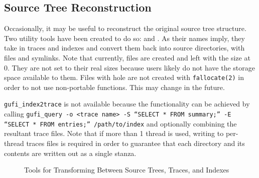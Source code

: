 \subsection{Source Tree Reconstruction}

Occasionally, it may be useful to reconstruct the original source tree
structure. Two utility tools have been created to do so: \gufitracedir
and \gufiindexdir. As their names imply, they take in traces and indexes
and convert them back into source directories, with files and
symlinks. Note that currently, files are created and left with the
size at 0. They are not set to their real sizes because users likely
do not have the storage space available to them. Files with hole are
not created with \texttt{fallocate(2)} in order to not use
non-portable functions. This may change in the future.

\texttt{gufi\_index2trace} is not available because the functionality
can be achieved by calling \texttt{gufi\_query -o <trace name> -S
  ``SELECT * FROM summary;'' -E ``SELECT * FROM entries;''
  /path/to/index} and optionally combining the resultant trace
files. Note that if more than 1 thread is used, writing to per-thread
traces files is required in order to guarantee that each
directory and its contents are written out as a single stanza.

\begin{figure}[H]
\centering
{}
\caption{Tools for Transforming Between Source Trees, Traces, and Indexes}
\end{figure}


